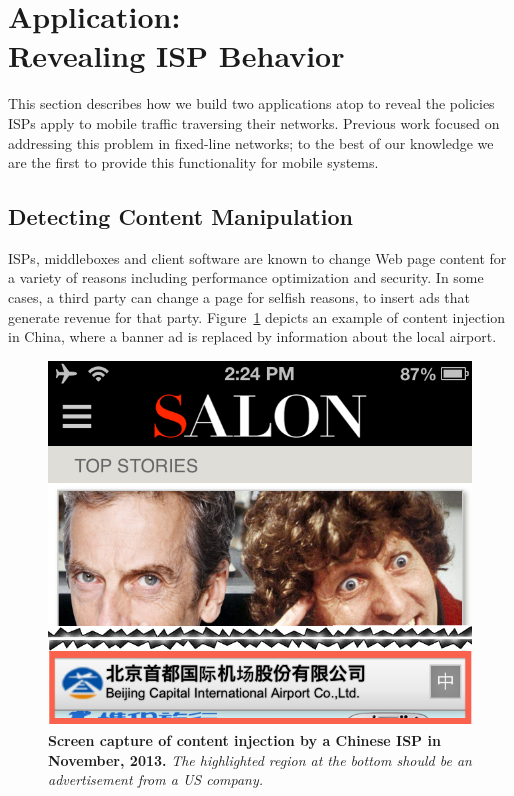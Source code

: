 \section{Application: \\
Revealing ISP Behavior}
\label{sec:isp-behavior}

This section describes how we build two applications atop \meddle to 
reveal the policies ISPs apply to mobile traffic traversing their networks. 
Previous work focused on addressing this problem in fixed-line networks; to 
the best of our knowledge we are the first to provide this functionality for 
mobile systems.

\subsection{Detecting Content Manipulation}

ISPs, middleboxes and client software are known to change Web page content for 
a variety of reasons including performance optimization and security. In some cases, 
a third party can change a page for selfish reasons, \eg to insert ads that generate revenue 
for that party. Figure~\ref{fig:tripnet-example} depicts an example of content injection in China, where 
a banner ad is replaced by information about the local airport.

\begin{figure}
\centering
\includegraphics[width=0.9\linewidth]{figures/injectioncrop.png}
\caption{\textbf{Screen capture of content injection by a Chinese ISP in November, 2013.} \emph{The 
highlighted region at the bottom should be an advertisement from a US company.} }
\vspace{\postfigspace}
\label{fig:tripnet-example}
\end{figure}


